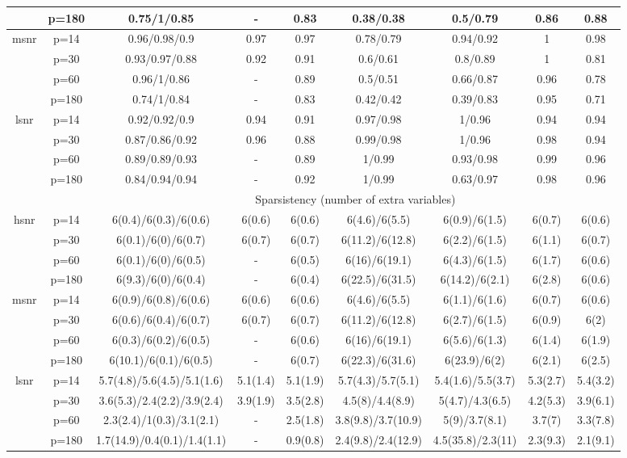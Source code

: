 \begin{table}[ht]
{\begin{tabular}{|c|c|ccccccc|}
   & p=180 & 0.75/1/0.85 & - & 0.83 & 0.38/0.38 & 0.5/0.79 & 0.86 & 0.88 \\ 
  \midrule\multirow{4}[2]{*}{msnr} & p=14 & 0.96/0.98/0.9 & 0.97 & 0.97 & 0.78/0.79 & 0.94/0.92 & 1 & 0.98 \\ 
   & p=30 & 0.93/0.97/0.88 & 0.92 & 0.91 & 0.6/0.61 & 0.8/0.89 & 1 & 0.81 \\ 
   & p=60 & 0.96/1/0.86 & - & 0.89 & 0.5/0.51 & 0.66/0.87 & 0.96 & 0.78 \\ 
   & p=180 & 0.74/1/0.84 & - & 0.83 & 0.42/0.42 & 0.39/0.83 & 0.95 & 0.71 \\ 
  \midrule\multirow{4}[2]{*}{lsnr} & p=14 & 0.92/0.92/0.9 & 0.94 & 0.91 & 0.97/0.98 & 1/0.96 & 0.94 & 0.94 \\ 
   & p=30 & 0.87/0.86/0.92 & 0.96 & 0.88 & 0.99/0.98 & 1/0.96 & 0.98 & 0.94 \\ 
   & p=60 & 0.89/0.89/0.93 & - & 0.89 & 1/0.99 & 0.93/0.98 & 0.99 & 0.96 \\ 
   & p=180 & 0.84/0.94/0.94 & - & 0.92 & 1/0.99 & 0.63/0.97 & 0.98 & 0.96 \\ 
   \midrule 
 \multicolumn{1}{|c}{} &       & \multicolumn{7}{c|}{Sparsistency (number of extra variables)} \\
\midrule\multirow{4}[2]{*}{hsnr} & p=14 & 6(0.4)/6(0.3)/6(0.6) & 6(0.6) & 6(0.6) & 6(4.6)/6(5.5) & 6(0.9)/6(1.5) & 6(0.7) & 6(0.6) \\ 
   & p=30 & 6(0.1)/6(0)/6(0.7) & 6(0.7) & 6(0.7) & 6(11.2)/6(12.8) & 6(2.2)/6(1.5) & 6(1.1) & 6(0.7) \\ 
   & p=60 & 6(0.1)/6(0)/6(0.5) & - & 6(0.5) & 6(16)/6(19.1) & 6(4.3)/6(1.5) & 6(1.7) & 6(0.6) \\ 
   & p=180 & 6(9.3)/6(0)/6(0.4) & - & 6(0.4) & 6(22.5)/6(31.5) & 6(14.2)/6(2.1) & 6(2.8) & 6(0.6) \\ 
  \midrule\multirow{4}[2]{*}{msnr} & p=14 & 6(0.9)/6(0.8)/6(0.6) & 6(0.6) & 6(0.6) & 6(4.6)/6(5.5) & 6(1.1)/6(1.6) & 6(0.7) & 6(0.6) \\ 
   & p=30 & 6(0.6)/6(0.4)/6(0.7) & 6(0.7) & 6(0.7) & 6(11.2)/6(12.8) & 6(2.7)/6(1.5) & 6(0.9) & 6(2) \\ 
   & p=60 & 6(0.3)/6(0.2)/6(0.5) & - & 6(0.6) & 6(16)/6(19.1) & 6(5.6)/6(1.3) & 6(1.4) & 6(1.9) \\ 
   & p=180 & 6(10.1)/6(0.1)/6(0.5) & - & 6(0.7) & 6(22.3)/6(31.6) & 6(23.9)/6(2) & 6(2.1) & 6(2.5) \\ 
  \midrule\multirow{4}[2]{*}{lsnr} & p=14 & 5.7(4.8)/5.6(4.5)/5.1(1.6) & 5.1(1.4) & 5.1(1.9) & 5.7(4.3)/5.7(5.1) & 5.4(1.6)/5.5(3.7) & 5.3(2.7) & 5.4(3.2) \\ 
   & p=30 & 3.6(5.3)/2.4(2.2)/3.9(2.4) & 3.9(1.9) & 3.5(2.8) & 4.5(8)/4.4(8.9) & 5(4.7)/4.3(6.5) & 4.2(5.3) & 3.9(6.1) \\ 
   & p=60 & 2.3(2.4)/1(0.3)/3.1(2.1) & - & 2.5(1.8) & 3.8(9.8)/3.7(10.9) & 5(9)/3.7(8.1) & 3.7(7) & 3.3(7.8) \\ 
   & p=180 & 1.7(14.9)/0.4(0.1)/1.4(1.1) & - & 0.9(0.8) & 2.4(9.8)/2.4(12.9) & 4.5(35.8)/2.3(11) & 2.3(9.3) & 2.1(9.1) \\ 
   \bottomrule 
\end{tabular}
}
\end{table}

